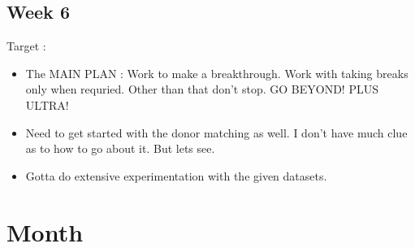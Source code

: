 \documentclass{article}
\begin{document}
\subsection{Week 6}
Target :
\begin{itemize}
\item The MAIN PLAN : Work to make a breakthrough. Work with taking breaks only when requried. Other than that don't stop. GO BEYOND! PLUS ULTRA!
\item Need to get started with the donor matching as well. I don't have much clue as to how to go about it. But lets see.
\item Gotta do extensive experimentation with the given datasets.
\end{itemize}
\section{Month}
\end{document}
